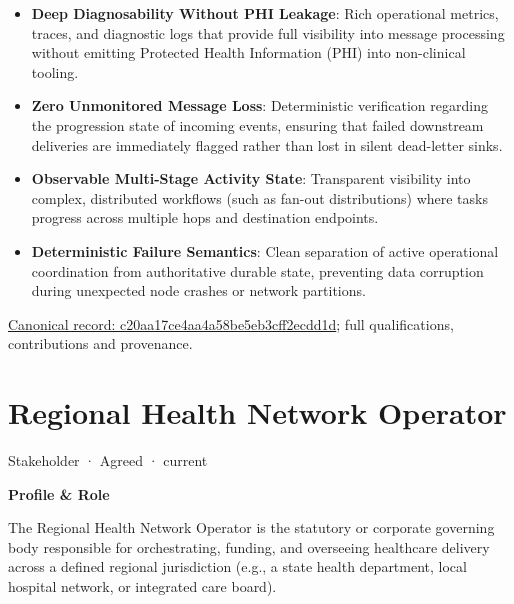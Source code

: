 \begin{itemize}


\item \textbf{Deep Diagnosability Without PHI Leakage}: Rich operational metrics, traces, and diagnostic logs that provide full visibility into message processing without emitting Protected Health Information (PHI) into non-clinical tooling.

\item \textbf{Zero Unmonitored Message Loss}: Deterministic verification regarding the progression state of incoming events, ensuring that failed downstream deliveries are immediately flagged rather than lost in silent dead-letter sinks.

\item \textbf{Observable Multi-Stage Activity State}: Transparent visibility into complex, distributed workflows (such as fan-out distributions) where tasks progress across multiple hops and destination endpoints.

\item \textbf{Deterministic Failure Semantics}: Clean separation of active operational coordination from authoritative durable state, preventing data corruption during unexpected node crashes or network partitions.

\end{itemize}

{\footnotesize \href{../../../../continuum/motivation/stakeholder/c20aa17ce4aa4a58be5eb3cff2ecdd1d.md}{Canonical record: c20aa17ce4aa4a58be5eb3cff2ecdd1d}; full qualifications, contributions and provenance.}\par
\section{Regional Health Network Operator}

\label{element:e76216c494fa4500bb80eda6f83513c1}
{\small Stakeholder · Agreed · current}\par

\par\medskip\textbf{Profile \& Role}\par


The Regional Health Network Operator is the statutory or corporate governing body responsible for orchestrating, funding, and overseeing healthcare delivery across a defined regional jurisdiction (e.g., a state health department, local hospital network, or integrated care board).



